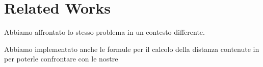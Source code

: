 \section{Related Works}
\label{relatedworks}

Abbiamo affrontato lo stesso problema \citet{mirizzilinked} in un contesto differente.

Abbiamo implementato anche le formule per il calcolo della distanza contenute in \citet{passant2010measuring} 
per poterle confrontare con le nostre
